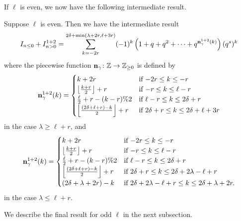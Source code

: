 If $\ell$ is even, we now have the following intermediate result.
\begin{proposition}
  Suppose $\ell$ is even.
  Then we have the intermediate result
  \[
    I_{n \le 0} + I_{n > 0}^{\text{1+2}}
    = \sum_{k = -2r}^{2\delta + \min(\lambda+2r, \ell+3r)}
    (-1)^k \left( 1 + q + q^2 + \dots + q^{\mathbf n^{1+2}_{\gamma}(k)}  \right) (q^s)^k
  \]
  where the piecewise function $\mathbf n_\gamma \colon \mathbb Z \to \mathbb Z_{\ge 0}$ is defined by
  \[
    \mathbf n^{1+2}_\gamma(k) =
    \begin{cases}
      k + 2r & \text{if } {-2r} \le k \le -r \\
      \left\lfloor \frac{k+r}{2} \right\rfloor + r & \text{if }{-r} \le k \le \ell-r \\
      \frac{\ell}{2} + r - (k-r)\%2 & \text{if } \ell - r \le k \le 2\delta + r \\
      \left\lfloor \frac{(2\delta+\ell+r)-k}{2} \right\rfloor + r & \text{if } 2\delta + r \le k \le 2\delta + \ell + 3r
    \end{cases}
  \]
  in the case $\lambda \ge \ell+r$, and
  \[
    \mathbf n^{1+2}_\gamma(k) =
    \begin{cases}
      k + 2r & \text{if } {-2r} \le k \le -r \\
      \left\lfloor \frac{k+r}{2} \right\rfloor + r & \text{if }{-r} \le k \le \ell-r \\
      \frac{\ell}{2} + r - (k-r) \% 2 & \text{if } \ell - r \le k \le 2\delta + r \\
      \left\lfloor \frac{(2\delta+\ell+r)-k}{2} \right\rfloor + r & \text{if } 2\delta + r \le k \le 2\delta + 2\lambda - \ell + r \\
      (2\delta + \lambda + 2r) - k & \text{if } 2 \delta + 2 \lambda - \ell + r \le k \le 2 \delta + \lambda + 2r.
    \end{cases}
  \]
  in the case $\lambda \le \ell+r$.
\end{proposition}

We describe the final result for odd $\ell$ in the next subsection.

